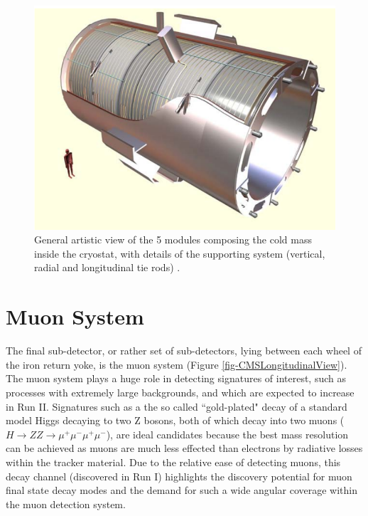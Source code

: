 \begin{figure} 
\begin{center}
\includegraphics[scale=0.5]{Figures/SuperconductingSolenoid.png}
\end{center}
\caption{ General artistic view of the 5 modules composing the cold mass inside the cryostat, with details of the supporting system (vertical, radial and longitudinal tie rods) \cite{CMSexperiment}.}
\label{fig-SuperconductingSolenoid}
\end{figure}


\section{Muon System} \label{sec-MuonSystem}

The final sub-detector, or rather set of sub-detectors, lying between each wheel of the iron return yoke, is the muon system (Figure \ref{fig-CMSLongitudinalView}). The muon system plays a huge role in detecting signatures of interest, such as processes with extremely large backgrounds, and which are expected to increase in Run II. Signatures such as a the so called ``gold-plated" decay of a standard model Higgs decaying to two Z bosons, both of which decay into two muons ($H \to ZZ \to \mu^+ \mu^- \mu^+ \mu^-$), are ideal candidates because the best mass resolution can be achieved as muons are much less effected than electrons by radiative losses within the tracker material. Due to the relative ease of detecting muons, this decay channel (discovered in Run I) highlights the discovery potential for muon final state decay modes and the demand for such a wide angular coverage within the muon detection system. 

